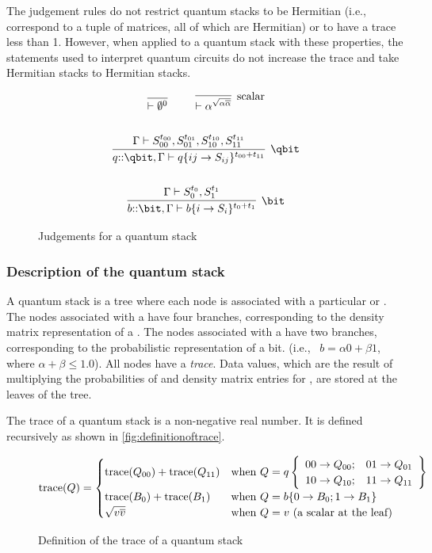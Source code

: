 The judgement rules do not 
restrict quantum stacks to be Hermitian (i.e., correspond
to a tuple of matrices, all of which are Hermitian)
 or to have a trace less than 1.
However, when applied to a quantum stack with these properties, 
the statements used to interpret quantum circuits
 do not increase the trace and take Hermitian stacks to Hermitian stacks.
\begin{figure}[htbp]
\[
\begin{gathered}
\infer[\text{}]
	{ \qentail \emptyset^{0}}{} \qquad
\infer[\text{scalar}]
	{\qentail \alpha^{\sqrt{\alpha\overline{\alpha}}}}{}\\ 
\\
\infer[\text{\qbit}]
	{q{::}\qbit, \Gamma \qentail 
          \qsnodeij{q}{ij}{S_{ij}}{t_{00} + t_{11}}}
        {\Gamma \qentail  S_{00}^{t_{00}},S_{01}^{t_{01}},S_{10}^{t_{10}},S_{11}^{t_{11}}}\\
\\
\infer[\text{\bit}]
	{b{::}\bit, \Gamma \qentail  \qsnodeij{b}{i}{S_{i}}{t_{0} + t_{1}}}
        {\Gamma \qentail  S_{0}^{t_{0}},S_{1}^{t_{1}} }\\
\end{gathered}
\]
\caption{Judgements  for a quantum stack}\label{fig:formingaquantumstack}
\end{figure}



\subsubsection{Description of the  quantum stack}
A quantum stack is a tree where each node is 
associated with a particular \bit{} or \qbit{}.
 The nodes associated with
a \qbit{}  have four branches, corresponding to the density matrix 
representation of a \qbit. The nodes associated with a \bit{} 
have two branches, corresponding to the probabilistic representation of a bit.
(i.e., \bit\ $b=\alpha 0 + \beta 1$, where $\alpha + \beta \le 1.0$). 
All nodes have a \emph{trace}. 
Data values, which are the result of multiplying the 
 probabilities of \bits{} and density matrix entries for \qbits{},
 are  stored at the leaves of the tree.

The trace of a quantum stack is a non-negative real number. It is defined recursively as shown in 
\vref{fig:definitionoftrace}.

\begin{figure}[htbp]
{\begin{singlespace}
\[  \text{trace}(Q) = 
\begin{cases}
\text{trace} (Q_{00}) + \text{trace} (Q_{11}) & \text{when}\ Q=
\qsqbitUp{q}{Q_{00}}{Q_{01}}{Q_{10}}{Q_{11}}{}\\
\text{trace} (B_{0}) + \text{trace} (B_{1}) & \text{when}\ Q=b\{0\qsp B_0; 1\qsp B_1\}\\
\sqrt{v\overline{v}} & \text{when}\ Q=v\ \text{(a scalar at the leaf)}
\end{cases}
\]
\end{singlespace}
}
\caption{Definition of the trace of a quantum stack}\label{fig:definitionoftrace}
\end{figure}

